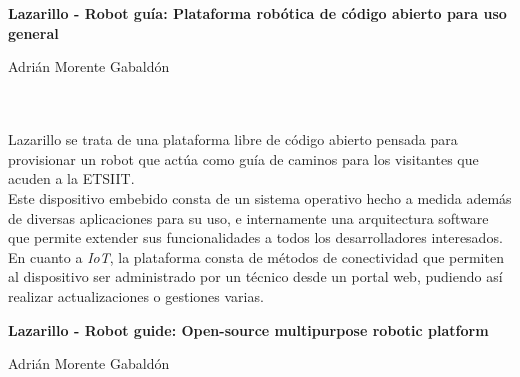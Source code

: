 \chapter*{}

\thispagestyle{empty}

\begin{center}
{\large\bfseries Lazarillo - Robot guía: Plataforma robótica de código abierto para uso general}\\
\end{center}
\begin{center}
Adrián Morente Gabaldón\\
\end{center}

\\

\vspace{0.7cm}
\\

Lazarillo se trata de una plataforma libre de código abierto pensada para provisionar un robot que actúa como guía de caminos para los visitantes que acuden a la ETSIIT.\\

Este dispositivo embebido consta de un sistema operativo hecho a medida además de diversas aplicaciones para su uso, e internamente una arquitectura software que permite extender sus funcionalidades a todos los desarrolladores interesados.\\

En cuanto a \textit{IoT}, la plataforma consta de métodos de conectividad que permiten al dispositivo ser administrado por un técnico desde un portal web, pudiendo así realizar actualizaciones o gestiones varias.
\cleardoublepage


\thispagestyle{empty}


\begin{center}
{\large\bfseries Lazarillo - Robot guide: Open-source multipurpose robotic platform}\\
\end{center}
\begin{center}
Adrián Morente Gabaldón\\
\end{center}

